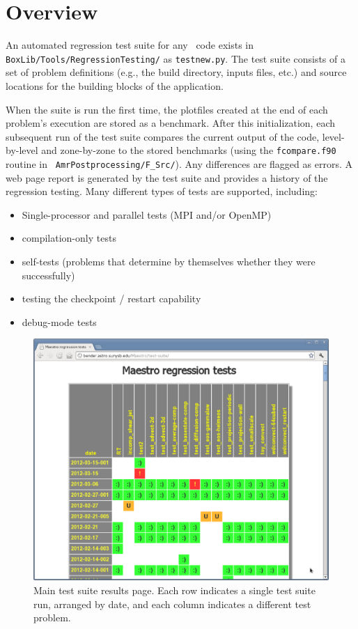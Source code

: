 \section{Overview}

An automated regression test suite for any \boxlib\ code
exists in {\tt BoxLib/Tools/RegressionTesting/} as {\tt testnew.py}.
The test suite consists of a set of problem definitions (e.g., the
build directory, inputs files, etc.) and source locations for the
building blocks of the application.

When the suite is run the first time, the plotfiles created at the end
of each problem's execution are stored as a benchmark.  After this
initialization, each subsequent run of the test suite compares the
current output of the code, level-by-level and zone-by-zone to the
stored benchmarks (using the {\tt fcompare.f90} routine in {\tt
  AmrPostprocessing/F\_Src/}).  Any differences are flagged as errors.
A web page report is generated by the test suite and provides a
history of the regression testing.  Many different types of tests
are supported, including:
\begin{itemize}
\item Single-processor and parallel tests (MPI and/or OpenMP)
\item compilation-only tests
\item self-tests (problems that determine by themselves whether they were successfully)
\item testing the checkpoint / restart capability
\item debug-mode tests
\end{itemize}

\begin{figure}[t]
\centering
\includegraphics[width=5.0in]{testsuite}
\caption{\label{fig:test_suite_main} Main test suite results page.  Each 
row indicates a single test suite run, arranged by date, and each column
indicates a different test problem. }
\end{figure}

